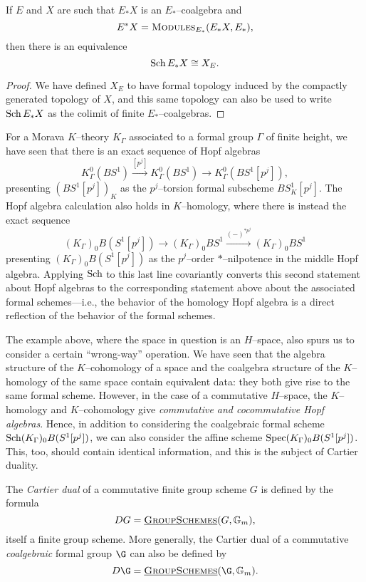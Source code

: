\begin{lemma}
If $E$ and $X$ are such that $E_* X$ is an $E_*$--coalgebra and \[E^* X = \normalfont\textsc{Modules}_{E_*}(E_* X, E_*),\] then there is an equivalence \[\operatorname{Sch} E_* X \cong X_E.\]
\end{lemma}
\begin{proof}
We have defined $X_E$ to have formal topology induced by the compactly generated topology of $X$, and this same topology can also be used to write $\operatorname{Sch} E_* X$ as the colimit of finite $E_*$--coalgebras.
\end{proof}

\begin{example}\label{KtheoryOfClassifyingSpace}
For a Morava $K$--theory $K_\Gamma$ associated to a formal group $\Gamma$ of finite height, we have seen that there is an exact sequence of Hopf algebras \[K_\Gamma^0(BS^1) \xrightarrow{[p^j]} K_\Gamma^0(BS^1) \to K_\Gamma^0(BS^1[p^j]),\] presenting $(BS^1[p^j])_K$ as the $p^j$--torsion formal subscheme $BS^1_K[p^j]$.  The Hopf algebra calculation also holds in $K$--homology, where there is instead the exact sequence \[(K_\Gamma)_0 B(S^1[p^j]) \to (K_\Gamma)_0 BS^1 \xrightarrow{(-)^{\ast p^j}} (K_\Gamma)_0 BS^1\] presenting $(K_\Gamma)_0 B(S^1[p^j])$ as the $p^j$--order $\ast$--nilpotence in the middle Hopf algebra.  Applying $\operatorname{Sch}$ to this last line covariantly converts this second statement about Hopf algebras to the corresponding statement above about the associated formal schemes---i.e., the behavior of the homology Hopf algebra is a direct reflection of the behavior of the formal schemes.
\end{example}

The example above, where the space in question is an $H$--space, also spurs us to consider a certain ``wrong-way'' operation.  We have seen that the algebra structure of the $K$--cohomology of a space and the coalgebra structure of the $K$--homology of the same space contain equivalent data: they both give rise to the same formal scheme.  However, in the case of a commutative $H$--space, the $K$--homology and $K$--cohomology give \emph{commutative and cocommutative Hopf algebras}.  Hence, in addition to considering the coalgebraic formal scheme $\operatorname{Sch} (K_\Gamma)_0 B(S^1[p^j])$, we can also consider the affine scheme $\operatorname{Spec} (K_\Gamma)_0 B(S^1[p^j])$.  This, too, should contain identical information, and this is the subject of Cartier duality.

\begin{definition}\label{DefnCartierDual}
The \textit{Cartier dual} of a commutative finite group scheme $G$ is defined by the formula \[DG = \operatorname{\underline{\smash{\normalfont\textsc{GroupSchemes}}}}(G, \mathbb G_m),\] itself a finite group scheme.  More generally, the Cartier dual of a commutative \emph{coalgebraic} formal group $\G$ can also be defined by \[D\G = \InternalHom{GroupSchemes}(\G, \Gm).\]
\end{definition}

